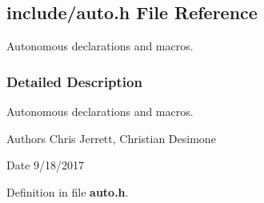 \subsection{include/auto.h File Reference}
\label{auto_8h}


Autonomous declarations and macros.  




\subsubsection{Detailed Description}
Autonomous declarations and macros. 

\begin{DoxyAuthor}{Authors}
Chris Jerrett, Christian Desimone 
\end{DoxyAuthor}
\begin{DoxyDate}{Date}
9/18/2017 
\end{DoxyDate}


Definition in file \textbf{ auto.\+h}.

